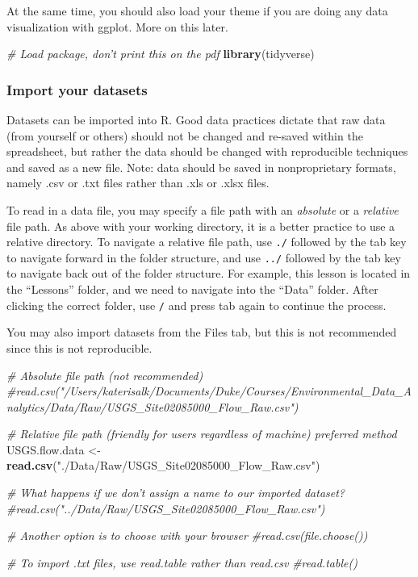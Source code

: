\documentclass[]{article}
\newenvironment{Shaded}{\begin{snugshade}}{\end{snugshade}}
\newcommand{\CommentTok}[1]{\textcolor[rgb]{0.56,0.35,0.01}{\textit{#1}}}
\newcommand{\KeywordTok}[1]{\textcolor[rgb]{0.13,0.29,0.53}{\textbf{#1}}}
\newcommand{\NormalTok}[1]{#1}
\newcommand{\StringTok}[1]{\textcolor[rgb]{0.31,0.60,0.02}{#1}}
\begin{document}
At the same time, you should also load your theme if you are doing any
data visualization with ggplot. More on this later.

\begin{Shaded}
\begin{Highlighting}[]
\CommentTok{# Load package, don't print this on the pdf }
\KeywordTok{library}\NormalTok{(tidyverse)}
\end{Highlighting}
\end{Shaded}

\hypertarget{import-your-datasets}{%
\subsubsection{Import your datasets}\label{import-your-datasets}}

Datasets can be imported into R. Good data practices dictate that raw
data (from yourself or others) should not be changed and re-saved within
the spreadsheet, but rather the data should be changed with reproducible
techniques and saved as a new file. Note: data should be saved in
nonproprietary formats, namely .csv or .txt files rather than .xls or
.xlsx files.

To read in a data file, you may specify a file path with an
\emph{absolute} or a \emph{relative} file path. As above with your
working directory, it is a better practice to use a relative directory.
To navigate a relative file path, use \texttt{./} followed by the tab
key to navigate forward in the folder structure, and use \texttt{../}
followed by the tab key to navigate back out of the folder structure.
For example, this lesson is located in the ``Lessons'' folder, and we
need to navigate into the ``Data'' folder. After clicking the correct
folder, use \texttt{/} and press tab again to continue the process.

You may also import datasets from the Files tab, but this is not
recommended since this is not reproducible.

\begin{Shaded}
\begin{Highlighting}[]
\CommentTok{# Absolute file path (not recommended)}
\CommentTok{#read.csv("/Users/katerisalk/Documents/Duke/Courses/Environmental_Data_Analytics/Data/Raw/USGS_Site02085000_Flow_Raw.csv")}

\CommentTok{# Relative file path (friendly for users regardless of machine) preferred method }
\NormalTok{USGS.flow.data <-}\StringTok{ }\KeywordTok{read.csv}\NormalTok{(}\StringTok{"./Data/Raw/USGS_Site02085000_Flow_Raw.csv"}\NormalTok{)}

\CommentTok{# What happens if we don't assign a name to our imported dataset?}
\CommentTok{#read.csv("../Data/Raw/USGS_Site02085000_Flow_Raw.csv")}

\CommentTok{# Another option is to choose with your browser}
\CommentTok{#read.csv(file.choose())}

\CommentTok{# To import .txt files, use read.table rather than read.csv}
\CommentTok{#read.table()}
\end{Highlighting}
\end{Shaded}
\end{document}
